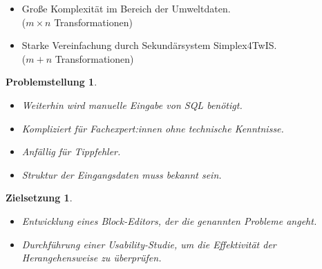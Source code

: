\begin{frame}

  \begin{itemize}
    \item Große Komplexität im Bereich der Umweltdaten.\\($m \times n$ Transformationen)
    \item Starke Vereinfachung durch Sekundärsystem Simplex4TwIS.\\($m + n$ Transformationen)
  \end{itemize}

  \newtheorem{pro}{Problemstellung}
  \begin{pro}
    \begin{itemize}
      \item Weiterhin wird manuelle Eingabe von SQL benötigt.
      \item Kompliziert für Fachexpert:innen ohne technische Kenntnisse.
      \item Anfällig für Tippfehler.
      \item Struktur der Eingangsdaten muss bekannt sein.
    \end{itemize}
  \end{pro}


\end{frame}

\begin{frame}

  \newtheorem{goal}{Zielsetzung}
  \begin{goal}
    \begin{itemize}
      \item Entwicklung eines Block-Editors, der die genannten Probleme angeht.
      \item Durchführung einer Usability-Studie, um die Effektivität der Herangehensweise zu überprüfen.
    \end{itemize}
  \end{goal}

\end{frame}
